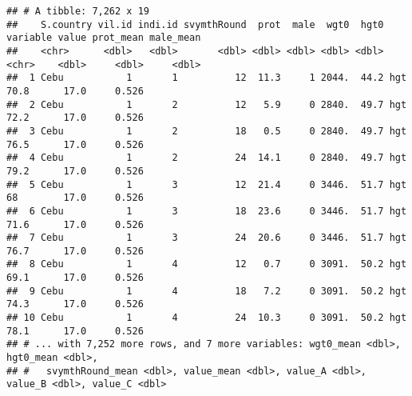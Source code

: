 \documentclass[
]{book}
\newenvironment{Shaded}{\begin{snugshade}}{\end{snugshade}}
\newcommand{\DataTypeTok}[1]{\textcolor[rgb]{0.13,0.29,0.53}{#1}}
\newcommand{\DecValTok}[1]{\textcolor[rgb]{0.00,0.00,0.81}{#1}}
\newcommand{\KeywordTok}[1]{\textcolor[rgb]{0.13,0.29,0.53}{\textbf{#1}}}
\newcommand{\NormalTok}[1]{#1}
\newcommand{\OperatorTok}[1]{\textcolor[rgb]{0.81,0.36,0.00}{\textbf{#1}}}
\newcommand{\OtherTok}[1]{\textcolor[rgb]{0.56,0.35,0.01}{#1}}
\newcommand{\StringTok}[1]{\textcolor[rgb]{0.31,0.60,0.02}{#1}}
\begin{document}
\begin{Shaded}
\end{Shaded}

\begin{verbatim}
## # A tibble: 7,262 x 19
##    S.country vil.id indi.id svymthRound  prot  male  wgt0  hgt0 variable value prot_mean male_mean
##    <chr>      <dbl>   <dbl>       <dbl> <dbl> <dbl> <dbl> <dbl> <chr>    <dbl>     <dbl>     <dbl>
##  1 Cebu           1       1          12  11.3     1 2044.  44.2 hgt       70.8      17.0     0.526
##  2 Cebu           1       2          12   5.9     0 2840.  49.7 hgt       72.2      17.0     0.526
##  3 Cebu           1       2          18   0.5     0 2840.  49.7 hgt       76.5      17.0     0.526
##  4 Cebu           1       2          24  14.1     0 2840.  49.7 hgt       79.2      17.0     0.526
##  5 Cebu           1       3          12  21.4     0 3446.  51.7 hgt       68        17.0     0.526
##  6 Cebu           1       3          18  23.6     0 3446.  51.7 hgt       71.6      17.0     0.526
##  7 Cebu           1       3          24  20.6     0 3446.  51.7 hgt       76.7      17.0     0.526
##  8 Cebu           1       4          12   0.7     0 3091.  50.2 hgt       69.1      17.0     0.526
##  9 Cebu           1       4          18   7.2     0 3091.  50.2 hgt       74.3      17.0     0.526
## 10 Cebu           1       4          24  10.3     0 3091.  50.2 hgt       78.1      17.0     0.526
## # ... with 7,252 more rows, and 7 more variables: wgt0_mean <dbl>, hgt0_mean <dbl>,
## #   svymthRound_mean <dbl>, value_mean <dbl>, value_A <dbl>, value_B <dbl>, value_C <dbl>
\end{verbatim}
\end{document}
